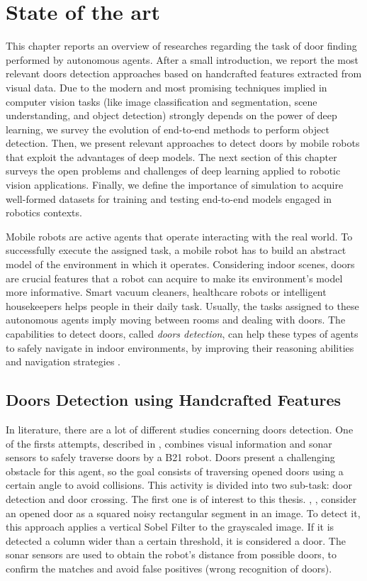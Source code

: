 \chapter{State of the art}
\label{capitolo2}
\thispagestyle{empty}

 This chapter reports an overview of researches regarding the task of door finding performed by autonomous agents. After a small introduction, we report the most relevant doors detection approaches based on handcrafted features extracted from visual data. Due to the modern and most promising techniques implied in computer vision tasks (like image classification and segmentation, scene understanding, and object detection) strongly depends on the power of deep learning, we survey the evolution of end-to-end methods to perform object detection. Then, we present relevant approaches to detect doors by mobile robots that exploit the advantages of deep models. The next section of this chapter surveys the open problems and challenges of deep learning applied to robotic vision applications. Finally, we define the importance of simulation to acquire well-formed datasets for training and testing end-to-end models engaged in robotics contexts.  
 
 Mobile robots are active agents that operate interacting with the real world. To successfully execute the assigned task, a mobile robot has to build an abstract model of the environment in which it operates. Considering indoor scenes, doors are crucial features that a robot can acquire to make its environment's model more informative. 
 Smart vacuum cleaners, healthcare robots or intelligent housekeepers helps people in their daily task. Usually, the tasks assigned to these autonomous agents imply moving between rooms and dealing with doors. The capabilities to detect doors, called \emph{doors detection}, can help these types of agents to safely navigate in indoor environments, by improving their reasoning abilities and navigation strategies \cite{sonarandivisualdoordetection, doorsandnavigation, humanoid}.
 
 \section{Doors Detection using Handcrafted Features}
  In literature, there are a lot of different studies concerning doors detection. One of the firsts attempts, described in \cite{sonarandivisualdoordetection}, combines visual information and sonar sensors to safely traverse doors by a B21 robot. Doors present a challenging obstacle for this agent, so the goal consists of traversing opened doors using a certain angle to avoid collisions. This activity is divided into two sub-task: door detection and door crossing. The first one is of interest to this thesis. \citeauthor{sonarandivisualdoordetection}, \cite{sonarandivisualdoordetection}, consider an opened door as a squared noisy rectangular segment in an image. To detect it, this approach applies a vertical Sobel Filter to the grayscaled image. If it is detected a column wider than a certain threshold, it is considered a door. The sonar sensors are used to obtain the robot's distance from possible doors, to confirm the matches and avoid false positives (wrong recognition of doors).
  
